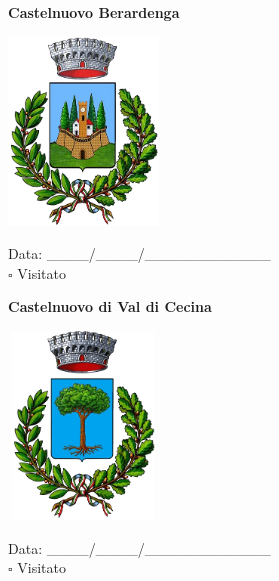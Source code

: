 \documentclass[a5paper,12pt]{article}
\begin{document}
\newpage

\noindent
\begin{minipage}[t]{0.45\textwidth}
    \begin{center}
        \textbf{Castelnuovo Berardenga}
    \end{center}
    \vspace{-0.5cm} %
    \begin{center}
        \includegraphics[height= 5cm, width=4cm]{Toscana/Stemma Castelnuovo Berardenga.png}
    \end{center}
    \vspace{-0.4cm} %
    \begin{flushleft}
        Data: \_\_\_\_/\_\_\_\_/\_\_\_\_\_\_\_\_\_\_\_\_ \\
        $\square$ Visitato
    \end{flushleft}
\end{minipage}
\hfill
\noindent
\begin{minipage}[t]{0.45\textwidth}
    \begin{center}
        \textbf{Castelnuovo di Val di Cecina}
    \end{center}
    \vspace{-0.5cm} %
    \begin{center}
        \includegraphics[height= 5cm, width=4cm]{Toscana/Stemma Castelnuovo di Val di Cecina.png}
    \end{center}
    \vspace{-0.4cm} %
    \begin{flushleft}
        Data: \_\_\_\_/\_\_\_\_/\_\_\_\_\_\_\_\_\_\_\_\_ \\
        $\square$ Visitato
    \end{flushleft}
\end{minipage}
\end{document}

